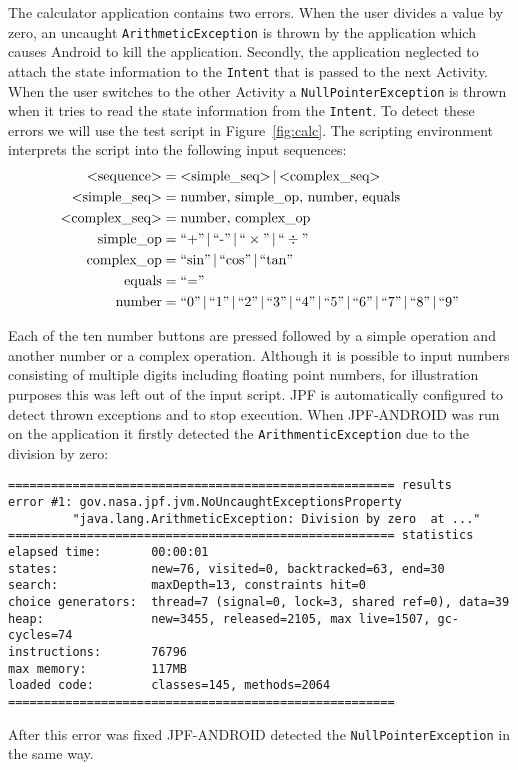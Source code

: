 \documentclass{acm_proc_article-sp}
\begin{document}
The calculator application contains two errors. When the user divides a value by zero, an uncaught
\texttt{ArithmeticException} is thrown by the application which causes Android to kill the application. Secondly, the application neglected
to attach the state information to the \texttt{Intent} that is passed to the next Activity. When the user switches to the other Activity a
\texttt{NullPointerException} is thrown when it tries to read the state information from the \texttt{Intent}. To detect these errors we will use the test script in Figure~\ref{fig:calc}. The scripting environment interprets the script into the
following input sequences:
\begin{align*}
	\text{<sequence>} &= \text{<simple\_seq>}\,|\,\text{<complex\_seq>}\\
	\text{<simple\_seq>} &= \text{number},\,\text{simple\_op},\,\text{number},\,\text{equals}\\
	\text{<complex\_seq>} &= \text{number},\,\text{complex\_op}\\
	\text{simple\_op} &= \text{``+''}\,|\,\text{``-''}\,|\,\text{``}\times\text{''}\,|\,\text{``}\div\text{''}\\
	\text{complex\_op} &= \text{``sin''}\,|\,\text{``cos''}\,|\,\text{``tan''}\\
	\text{equals} &= \text{``=''} \\
	\text{number} &= \text{``0''\,|\,``1''\,|\,``2''\,|\,``3''\,|\,``4''\,|\,``5''\,|\,``6''\,|\,``7''\,|\,``8''\,|\,``9''}
\end{align*}

Each of the ten number buttons are pressed followed by a simple operation and another number or a complex operation. Although it is possible
to input numbers consisting of multiple digits including floating point numbers, for illustration purposes this was left out of the input script.
JPF is automatically configured to detect thrown exceptions and to stop execution. When JPF-ANDROID was run on the application it firstly
detected the \texttt{ArithmenticException} due to the division by zero:

\vspace*{-10pt}
\begingroup
 \fontsize{6pt}{7pt}\selectfont
\begin{verbatim}
====================================================== results
error #1: gov.nasa.jpf.jvm.NoUncaughtExceptionsProperty 
         "java.lang.ArithmeticException: Division by zero  at ..."
====================================================== statistics
elapsed time:       00:00:01
states:             new=76, visited=0, backtracked=63, end=30
search:             maxDepth=13, constraints hit=0
choice generators:  thread=7 (signal=0, lock=3, shared ref=0), data=39
heap:               new=3455, released=2105, max live=1507, gc-cycles=74
instructions:       76796
max memory:         117MB
loaded code:        classes=145, methods=2064
======================================================
\end{verbatim}
\endgroup
\vspace*{-10pt}
After this error was fixed JPF-ANDROID detected the \texttt{NullPointerException} in the same way.
\end{document}

